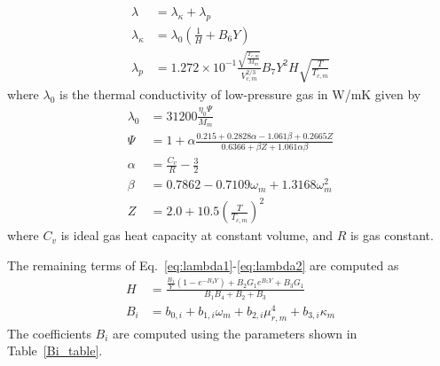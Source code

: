 \begin{align}
	\lambda          & = \lambda_{\kappa} +\lambda_p                                                                                            \\
	\lambda_{\kappa} & = \lambda_0 \left( \frac{1}{H}+B_6 Y \right)  \label{eq:lambda1}                                                         \\
	\lambda_p        & = 1.272\times 10^{-1}\frac{\sqrt{\frac{ T_{c,m}}{M_m}}}{V_{c,m}^{2/3}}B_7Y^2H \sqrt{\frac{T}{T_{c,m}}}\label{eq:lambda2}
\end{align}
where $\lambda_0$ is the thermal conductivity of low-pressure gas in W/mK given by
\begin{align}
	\lambda_0 & =31200 \frac{\eta_0\Psi}{M_m}                                                                   \\
	\Psi      & = 1 +\alpha\frac{0.215 + 0.2828\alpha-1.061\beta+0.2665Z }{0.6366 +\beta Z +1.061\alpha \beta } \\
	\alpha    & = \frac{C_v}{R} -\frac{3}{2}                                                                    \\
	\beta     & = 0.7862 - 0.7109 \omega_m + 1.3168 \omega_m^2                                                  \\
	Z         & = 2.0+10.5 \left(\frac{T}{T_{c,m}}\right)^2
\end{align}
where $C_v$ is ideal gas heat capacity at constant volume, and $R$ is gas constant.

The remaining terms of Eq.~\ref{eq:lambda1}-\ref{eq:lambda2} are computed as
\begin{align}
	H     & = \frac{\frac{B_1}{Y}\left(1-e^{-B_4Y}\right) +B_2G_1 e^{B_5Y}+B_3 G_1}{B_1B_4 +B_2 +B_3} \\
	B_{i} & = b_{0,i} + b_{1,i}\omega_m + b_{2,i} \mu_{r,m}^4 + b_{3,i} \kappa_m
\end{align}
The coefficients $B_i$ are computed using the parameters shown in Table~\ref{Bi_table}.


